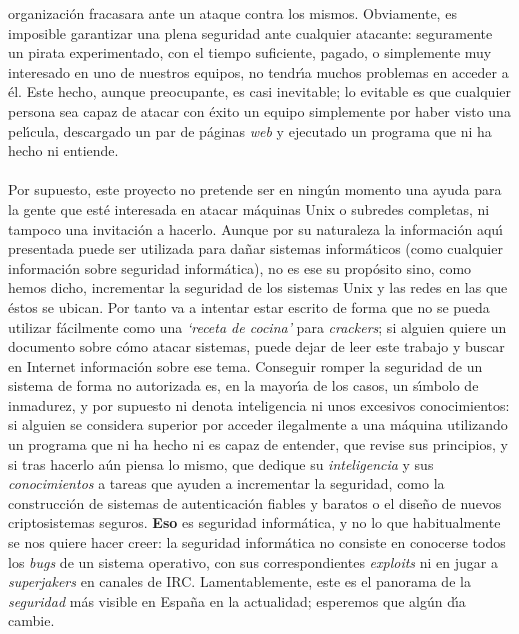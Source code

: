 organizaci\'on fracasara ante un ataque contra los mismos. Obviamente, es 
imposible garantizar una plena seguridad ante cualquier atacante: seguramente
un pirata experimentado, con el tiempo suficiente, pagado, o simplemente muy 
interesado en uno de nuestros equipos, no tendr\'{\i}a muchos problemas en 
acceder a \'el. Este hecho, aunque preocupante, es casi inevitable; lo evitable
es que cualquier persona sea capaz de atacar con \'exito un equipo simplemente 
por haber visto una pel\'{\i}cula, descargado un par de p\'aginas {\it web} y 
ejecutado un programa que ni ha hecho ni entiende.\\
\\Por supuesto, este proyecto no pretende ser en ning\'un momento una ayuda 
para la gente que est\'e interesada en atacar m\'aquinas Unix o subredes 
completas, ni tampoco una invitaci\'on a hacerlo. 
Aunque por su naturaleza la informaci\'on aqu\'{\i} presentada 
puede ser utilizada para da\~nar sistemas inform\'aticos (como cualquier 
informaci\'on sobre seguridad inform\'atica), no es ese su 
prop\'osito sino, como hemos dicho, incrementar la seguridad de los sistemas
Unix y las redes en las que \'estos se ubican. Por tanto va a intentar estar 
escrito de forma que no
se pueda utilizar f\'acilmente como una {\it `receta de cocina'} para {\it 
crackers}; si alguien quiere un documento sobre c\'omo atacar 
sistemas, puede dejar de leer este trabajo y buscar en Internet informaci\'on 
sobre ese tema. Conseguir romper la seguridad de un sistema de forma no 
autorizada 
es, en la mayor\'{\i}a de los casos, un s\'{\i}mbolo de inmadurez, y por 
supuesto ni denota inteligencia ni unos excesivos conocimientos: si alguien se
considera superior por acceder ilegalmente a una m\'aquina utilizando un
programa que ni ha hecho ni es capaz de entender, que revise
sus principios, y si tras ha\-cer\-lo a\'un piensa lo mismo, que dedique
su {\it inteligencia} y sus {\it conocimientos} a tareas que ayuden a 
incrementar la seguridad, como la construcci\'on de sistemas de autenticaci\'on 
fiables y baratos o el dise\~no de nuevos criptosistemas seguros. {\bf
Eso} es seguridad inform\'atica, y no lo que habitualmente se nos quiere hacer
creer: la seguridad inform\'atica no consiste en conocerse todos los {\it bugs}
de un sistema operativo, con sus correspondientes {\it exploits} ni en jugar 
a {\it superjakers} en canales de {\sc IRC}. Lamentablemente, este es
el panorama de la {\it seguridad} m\'as visible en Espa\~na en la actualidad;
esperemos que alg\'un d\'{\i}a cambie.
